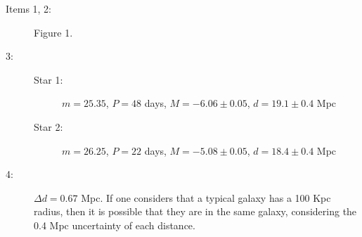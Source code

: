 
\begin{description}
\item[Items 1, 2:] Figure 1.

\item[3:] \hfill
  \begin{description}
  \item[Star 1:] $m = 25.35$, $P = 48$ days, $M = -6.06 \pm 0.05$,
    $d = 19.1 \pm 0.4$ Mpc
  \item[Star 2:] $m = 26.25$, $P = 22$ days, $M = -5.08 \pm 0.05$,
    $d = 18.4 \pm 0.4$ Mpc
  \end{description}

\item[4:] $\Delta d = 0.67$ Mpc. If one considers that a typical galaxy has a
  100 Kpc radius, then it is possible that they are in the same galaxy,
  considering the 0.4 Mpc uncertainty of each distance.
\end{description}
